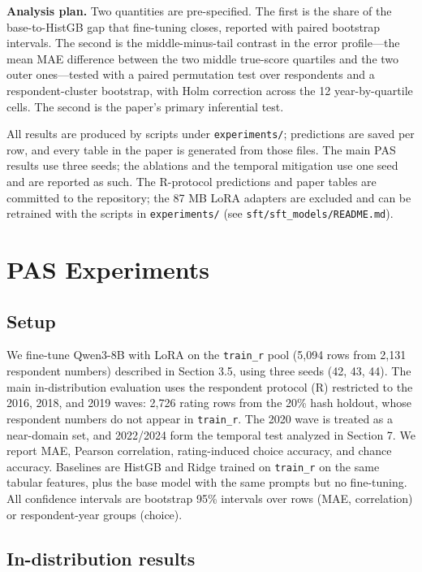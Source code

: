\textbf{Analysis plan.} Two quantities are pre-specified. The first is
the share of the base-to-HistGB gap that fine-tuning closes, reported
with paired bootstrap intervals. The second is the middle-minus-tail
contrast in the error profile---the mean MAE difference between the two
middle true-score quartiles and the two outer ones---tested with a
paired permutation test over respondents and a respondent-cluster
bootstrap, with Holm correction across the 12 year-by-quartile cells.
The second is the paper's primary inferential test.

All results are produced by scripts under \texttt{experiments/};
predictions are saved per row, and every table in the paper is generated
from those files. The main PAS results use three seeds; the ablations
and the temporal mitigation use one seed and are reported as such. The
R-protocol predictions and paper tables are committed to the repository;
the 87 MB LoRA adapters are excluded and can be retrained with the
scripts in \texttt{experiments/} (see
\texttt{sft/sft\_models/README.md}).

\section{PAS Experiments}\label{pas-experiments}

\subsection{Setup}\label{setup}

We fine-tune Qwen3-8B with LoRA on the \texttt{train\_r} pool (5,094
rows from 2,131 respondent numbers) described in Section 3.5, using
three seeds (42, 43, 44). The main in-distribution evaluation uses the
respondent protocol (R) restricted to the 2016, 2018, and 2019 waves:
2,726 rating rows from the 20\% hash holdout, whose respondent numbers
do not appear in \texttt{train\_r}. The 2020 wave is treated as a
near-domain set, and 2022/2024 form the temporal test analyzed in
Section 7. We report MAE, Pearson correlation, rating-induced choice
accuracy, and chance accuracy. Baselines are HistGB and Ridge trained on
\texttt{train\_r} on the same tabular features, plus the base model with
the same prompts but no fine-tuning. All confidence intervals are
bootstrap 95\% intervals \citep{efron1993bootstrap} over rows (MAE,
correlation) or respondent-year groups (choice).

\subsection{In-distribution results}\label{in-distribution-results}

